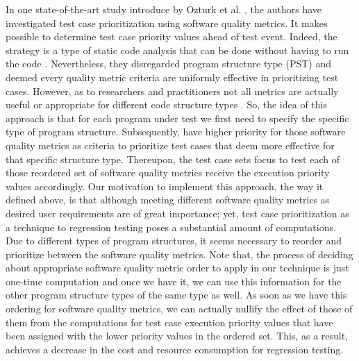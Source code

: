 \documentclass{sig-alternate}
\begin{document}
In one state-of-the-art study introduce by Ozturk et al. \cite{ozturk:quality}, the authors have investigated test case prioritization using software quality metrics. It makes possible to determine test case priority values ahead of test event. Indeed, the strategy is a type of static code analysis that can be done without having to run the code \cite{ozturk:quality}. Nevertheless, they disregarded program structure type (PST) and deemed every quality metric criteria are uniformly effective in prioritizing test cases. However, as to researchers and practitioners not all metrics are actually useful or appropriate for different code structure types \cite{suresh:metrics}. So, the idea of this approach is that for each program under test we first need to specify the specific type of program structure. Subsequently, have higher priority for those software quality metrics as criteria to prioritize test cases that deem more effective for that specific structure type. Thereupon, the test case sets focus to test each of those reordered set of software quality metrics receive the execution priority values accordingly. Our motivation to implement this approach, the way it defined above, is that although meeting different software quality metrics as desired user requirements are of great importance; yet, test case prioritization as a technique to regression testing poses a substantial amount of computations. Due to different types of program structures, it seems necessary to reorder and prioritize between the software quality metrics. Note that, the process of deciding about appropriate software quality metric order to apply in our technique is just one-time computation and once we have it, we can use this information for the other program structure types of the same type as well. As soon as we have this ordering for software quality metrics, we can actually nullify the effect of those of them from the computations for test case execution priority values that have been assigned with the lower priority values in the ordered set. This, as a result, achieves a decrease in the cost and resource consumption for regression testing.
\end{document}
